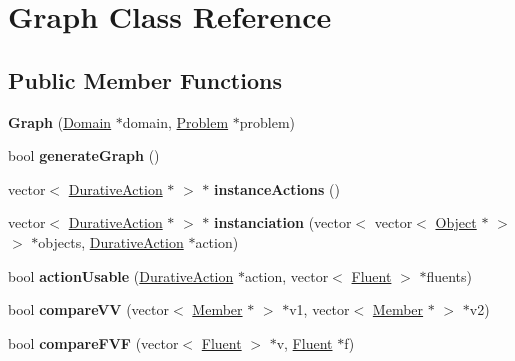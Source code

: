 \hypertarget{classGraph}{\section{Graph Class Reference}
\label{classGraph}
}
\subsection*{Public Member Functions}
\begin{DoxyCompactItemize}
\item 
\hypertarget{classGraph_a77d88eb37f823cc1c27889f2ad3ae06f}{{\bfseries Graph} (\hyperlink{classDomain}{Domain} $\ast$domain, \hyperlink{classProblem}{Problem} $\ast$problem)}\label{classGraph_a77d88eb37f823cc1c27889f2ad3ae06f}

\item 
\hypertarget{classGraph_a822586b22c9d6d78c62545b284fc3e8b}{bool {\bfseries generate\+Graph} ()}\label{classGraph_a822586b22c9d6d78c62545b284fc3e8b}

\item 
\hypertarget{classGraph_a2231f5ef132d572a85f80b3d286d744a}{vector$<$ \hyperlink{classDurativeAction}{Durative\+Action} $\ast$ $>$ $\ast$ {\bfseries instance\+Actions} ()}\label{classGraph_a2231f5ef132d572a85f80b3d286d744a}

\item 
\hypertarget{classGraph_a611db0289e23254785e90a396f1768a6}{vector$<$ \hyperlink{classDurativeAction}{Durative\+Action} $\ast$ $>$ $\ast$ {\bfseries instanciation} (vector$<$ vector$<$ \hyperlink{classObject}{Object} $\ast$ $>$ $>$ $\ast$objects, \hyperlink{classDurativeAction}{Durative\+Action} $\ast$action)}\label{classGraph_a611db0289e23254785e90a396f1768a6}

\item 
\hypertarget{classGraph_a9f4a33da5d1bc494c690f4ee0ee9849a}{bool {\bfseries action\+Usable} (\hyperlink{classDurativeAction}{Durative\+Action} $\ast$action, vector$<$ \hyperlink{classFluent}{Fluent} $>$ $\ast$fluents)}\label{classGraph_a9f4a33da5d1bc494c690f4ee0ee9849a}

\item 
\hypertarget{classGraph_ada60663cee9d68933e252f64f404d65d}{bool {\bfseries compare\+V\+V} (vector$<$ \hyperlink{classMember}{Member} $\ast$ $>$ $\ast$v1, vector$<$ \hyperlink{classMember}{Member} $\ast$ $>$ $\ast$v2)}\label{classGraph_ada60663cee9d68933e252f64f404d65d}

\item 
\hypertarget{classGraph_a9fd6901be8eee501efff575a43983ef6}{bool {\bfseries compare\+F\+V\+F} (vector$<$ \hyperlink{classFluent}{Fluent} $>$ $\ast$v, \hyperlink{classFluent}{Fluent} $\ast$f)}\label{classGraph_a9fd6901be8eee501efff575a43983ef6}


\end{DoxyCompactItemize}
